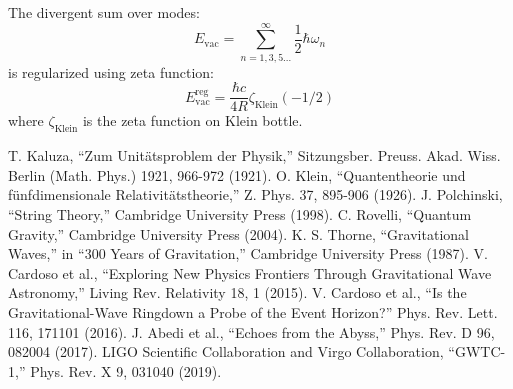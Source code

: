 \documentclass[12pt,a4paper]{article}
\begin{document}
The divergent sum over modes:
\begin{equation}
E_\mathrm{vac} = \sum_{n=1,3,5...}^{\infty} \frac{1}{2}\hbar\omega_n
\end{equation}
is regularized using zeta function:
\begin{equation}
E_\mathrm{vac}^{\mathrm{reg}} = \frac{\hbar c}{4R} \zeta_\mathrm{Klein}(-1/2)
\end{equation}
where $\zeta_\mathrm{Klein}$ is the zeta function on Klein bottle.

% 
% 

\begin{thebibliography}{10}
 T. Kaluza, ``Zum Unitätsproblem der Physik,'' Sitzungsber. Preuss. Akad. Wiss. Berlin (Math. Phys.) 1921, 966-972 (1921).
 O. Klein, ``Quantentheorie und fünfdimensionale Relativitätstheorie,'' Z. Phys. 37, 895-906 (1926).
 J. Polchinski, ``String Theory,'' Cambridge University Press (1998).
 C. Rovelli, ``Quantum Gravity,'' Cambridge University Press (2004).
 K. S. Thorne, ``Gravitational Waves,'' in ``300 Years of Gravitation,'' Cambridge University Press (1987).
 V. Cardoso et al., ``Exploring New Physics Frontiers Through Gravitational Wave Astronomy,'' Living Rev. Relativity 18, 1 (2015).
 V. Cardoso et al., ``Is the Gravitational-Wave Ringdown a Probe of the Event Horizon?'' Phys. Rev. Lett. 116, 171101 (2016).
 J. Abedi et al., ``Echoes from the Abyss,'' Phys. Rev. D 96, 082004 (2017).
 LIGO Scientific Collaboration and Virgo Collaboration, ``GWTC-1,'' Phys. Rev. X 9, 031040 (2019).
\end{thebibliography}
\end{document}
